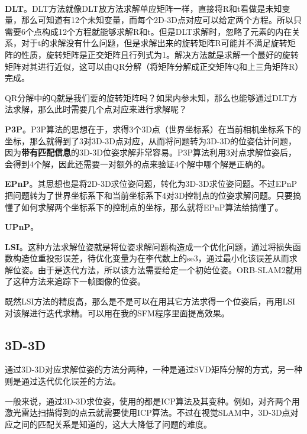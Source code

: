 ~\\

\textbf{DLT}。DLT方法就像DLT放方法求解单应矩阵一样，直接将R和t看做是未知变量，那么可知道有12个未知变量，而每个2D-3D点对应可以给定两个方程。所以只需要6个点构成12个方程就能够求解R和t。但是DLT求解时，忽略了元素的内在关系，对于t的求解没有什么问题，但是求解出来的旋转矩阵R可能并不满足旋转矩阵的性质，旋转矩阵是正交矩阵且行列式为1。解决方法就是求解一个最好的旋转矩阵对其进行近似，这可以由QR分解（将矩阵分解成正交矩阵Q和上三角矩阵R）完成。
\begin{note}
	QR分解中的Q就是我们要的旋转矩阵吗？如果内参未知，那么也能够通过DLT方法求解，那么此时需要几个点对应来进行求解呢？
\end{note}


\textbf{P3P}。P3P算法的思想在于，求得3个3D点（世界坐标系）在当前相机坐标系下的坐标，那么就得到了3对3D-3D点对应，从而将问题转为3D-3D的位姿估计问题，因为\textbf{带有匹配信息}的3D-3D位姿求解非常容易。P3P算法利用3对点求解位姿后，会得到4个解，因此还需要一对额外的点来验证4个解中哪个解是正确的。


\textbf{EPnP}。其思想也是将2D-3D求位姿问题，转化为3D-3D求位姿问题。不过EPnP把问题转为了世界坐标系下和当前坐标系下4对3D控制点的位姿求解问题。只要搞懂了如何求解两个坐标系下的控制点的坐标，那么就将EPnP算法给搞懂了。

\textbf{UPnP}。

\textbf{LSI}。这种方法求解位姿就是将位姿求解问题构造成一个优化问题，通过将损失函数构造位重投影误差，待优化变量为在李代数上的se3，通过最小化该误差从而求解位姿。由于是迭代方法，所以该方法需要给定一个初始位姿。ORB-SLAM2就用了这种方法来追踪下一帧图像的位姿。



\begin{note}
	既然LSI方法的精度高，那么是不是可以在用其它方法求得一个位姿后，再用LSI对该解进行迭代求精。可以用在我的SFM程序里面提高效果。
\end{note}


\subsection{3D-3D}

通过3D-3D对应求解位姿的方法分两种，一种是通过SVD矩阵分解的方式，另一种则是通过迭代优化误差的方法。

一般来说，通过3D-3D求位姿，使用的都是ICP算法及其变种。例如，对齐两个用激光雷达扫描得到的点云就需要使用ICP算法。不过在视觉SLAM中，3D-3D点对应之间的匹配关系是知道的，这大大降低了问题的难度。

